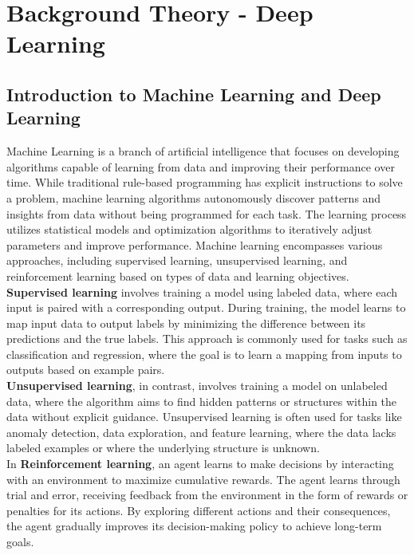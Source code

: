 \chapter{Background Theory - Deep Learning}
\label{chap:Theory-Deep Learning}
\section{Introduction to Machine Learning and Deep Learning}
Machine Learning is a branch of artificial intelligence that focuses on developing algorithms capable of learning from data and improving their performance over time. While traditional rule-based programming has explicit instructions to solve a problem, machine learning algorithms autonomously discover patterns and insights from data without being programmed for each task. The learning process utilizes statistical models and optimization algorithms to iteratively adjust parameters and improve performance. Machine learning encompasses various approaches, including supervised learning, unsupervised learning, and reinforcement learning based on types of data and learning objectives. \\

\textbf{Supervised learning} involves training a model using labeled data, where each input is paired with a corresponding output. During training, the model learns to map input data to output labels by minimizing the difference between its predictions and the true labels. This approach is commonly used for tasks such as classification and regression, where the goal is to learn a mapping from inputs to outputs based on example pairs. \\

\textbf{Unsupervised learning}, in contrast, involves training a model on unlabeled data, where the algorithm aims to find hidden patterns or structures within the data without explicit guidance. Unsupervised learning is often used for tasks like anomaly detection, data exploration, and feature learning, where the data lacks labeled examples or where the underlying structure is unknown. \\

In \textbf{Reinforcement learning}, an agent learns to make decisions by interacting with an environment to maximize cumulative rewards. The agent learns through trial and error, receiving feedback from the environment in the form of rewards or penalties for its actions. By exploring different actions and their consequences, the agent gradually improves its decision-making policy to achieve long-term goals. \\

